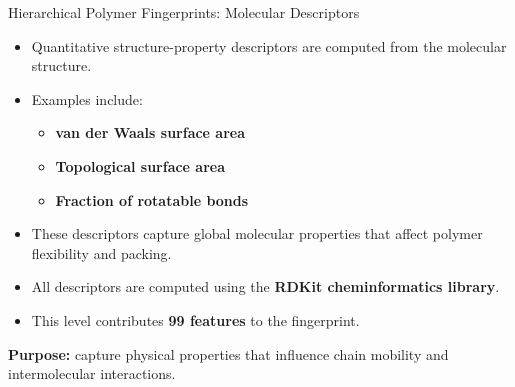 \documentclass[9pt]{beamer}
\begin{document}
\begin{frame}{Hierarchical Polymer Fingerprints: Molecular Descriptors}

\begin{itemize}
\setlength{\itemsep}{1em}

\item Quantitative structure-property descriptors are computed
from the molecular structure.

\item Examples include:

\begin{itemize}
\item \textbf{van der Waals surface area}
\item \textbf{Topological surface area}
\item \textbf{Fraction of rotatable bonds}
\end{itemize}

\item These descriptors capture global molecular properties that
affect polymer flexibility and packing.

\item All descriptors are computed using the
\textbf{RDKit cheminformatics library}.

\item This level contributes \textbf{99 features} to the fingerprint.

\end{itemize}

\vspace{0.5em}

\textbf{Purpose:} capture physical properties that influence
chain mobility and intermolecular interactions.

\end{frame}
\end{document}
